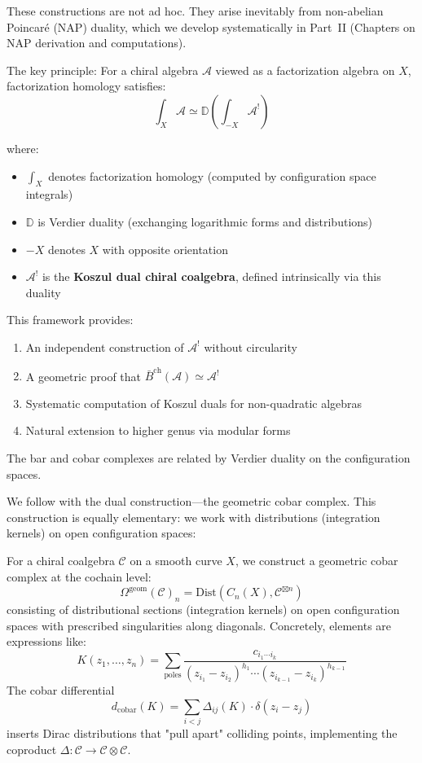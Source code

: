 \begin{remark}
\label{rem:NAP-foundation}
These constructions are not ad hoc. They arise inevitably from non-abelian Poincaré (NAP) duality, which we develop systematically in Part~II (Chapters on NAP derivation and computations).

The key principle: For a chiral algebra $\mathcal{A}$ viewed as a factorization algebra on $X$, factorization homology satisfies:
$$\int_X \mathcal{A} \simeq \mathbb{D}\left(\int_{-X} \mathcal{A}^!\right)$$

where:
\begin{itemize}
\item $\int_X$ denotes factorization homology (computed by configuration space integrals)
\item $\mathbb{D}$ is Verdier duality (exchanging logarithmic forms and distributions)
\item $-X$ denotes $X$ with opposite orientation
\item $\mathcal{A}^!$ is the \textbf{Koszul dual chiral coalgebra}, defined intrinsically via this duality
\end{itemize}

This framework provides:
\begin{enumerate}
\item An independent construction of $\mathcal{A}^!$ without circularity
\item A geometric proof that $\bar{B}^{\text{ch}}(\mathcal{A}) \simeq \mathcal{A}^!$
\item Systematic computation of Koszul duals for non-quadratic algebras
\item Natural extension to higher genus via modular forms
\end{enumerate}

The bar and cobar complexes are related by Verdier duality on the configuration spaces.
\end{remark}

We follow with the dual construction—the geometric cobar complex. This construction is equally elementary: we work with distributions (integration kernels) on open configuration spaces:

\begin{theorem}
For a chiral coalgebra $\mathcal{C}$ on a smooth curve $X$, we construct a geometric cobar complex at the cochain level:
$$\Omega^{\text{geom}}(\mathcal{C})_n = \text{Dist}(C_n(X), \mathcal{C}^{\boxtimes n})$$
consisting of distributional sections (integration kernels) on open configuration spaces with prescribed singularities along diagonals. Concretely, elements are expressions like:
$$K(z_1, \ldots, z_n) = \sum_{\text{poles}} \frac{c_{i_1 \cdots i_k}}{(z_{i_1} - z_{i_2})^{h_1} \cdots (z_{i_{k-1}} - z_{i_k})^{h_{k-1}}}$$
The cobar differential
$$d_{\text{cobar}}(K) = \sum_{i<j} \Delta_{ij}(K) \cdot \delta(z_i - z_j)$$
inserts Dirac distributions that "pull apart" colliding points, implementing the coproduct $\Delta: \mathcal{C} \to \mathcal{C} \otimes \mathcal{C}$.
\end{theorem}

